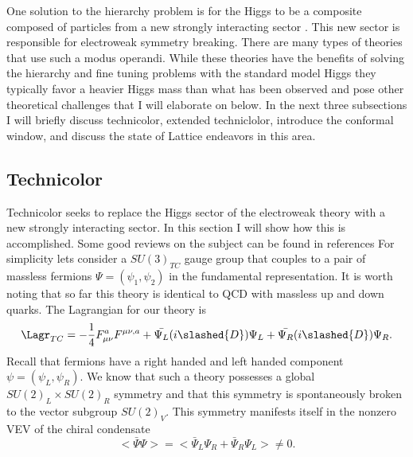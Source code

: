 
One solution to the hierarchy problem is for the Higgs to be a composite composed of particles from a new strongly interacting sector \cite{Kaplan:1983sm,Georgi:1984af,Weinberg:1975gm,Susskind:1978ms, Weinberg:1979bn, Eichten:1979ah, Dimopoulos:1979es}.
This new sector is responsible for electroweak symmetry breaking.
There are many types of theories that use such a modus operandi.
While these theories have the benefits of solving the hierarchy and fine tuning problems with the standard model Higgs they typically favor a heavier Higgs mass than what has been observed and pose other theoretical challenges that I will elaborate on below.
In the next three subsections I will briefly discuss technicolor, extended techniclolor, introduce the conformal window, and discuss the state of Lattice endeavors in this area.

\subsection{Technicolor}

Technicolor seeks to replace the Higgs sector of the electroweak theory with a new strongly interacting sector.
In this section I will show how this is accomplished.
Some good reviews on the subject can be found in references \cite{Hill2003235,lane,Shrock:2007km,martin,Sannino:2009za}
For simplicity lets consider a $SU(3)_{TC}$ gauge group that couples to a pair of massless fermions $\Psi=(\psi_1,\psi_2)$ in the fundamental representation.
It is worth noting that so far this theory is identical to QCD with massless up and down quarks.
The Lagrangian for our theory is
\begin{equation}
  \begin{aligned}
    \Lagr_{TC}=-\frac{1}{4}F^a_{\mu\nu}F^{\mu\nu,a}+\bar{\Psi_L}(i\slashed{D})\Psi_L+\bar{\Psi_R}(i\slashed{D})\Psi_R.
  \end{aligned}
\end{equation}
Recall that fermions have a right handed and left handed component $\psi=(\psi_L,\psi_R)$.
We know that such a theory possesses a global $SU(2)_L\times SU(2)_R$ symmetry and that this symmetry is spontaneously broken to the vector subgroup $SU(2)_V$.
This symmetry manifests itself in the nonzero VEV of the chiral condensate
\begin{equation}
  <\bar{\Psi}\Psi>=<\bar{\Psi}_L\Psi_R+\bar{\Psi}_R\Psi_L>\neq 0.
\end{equation}

